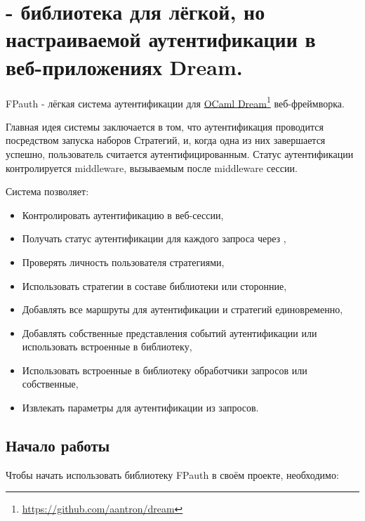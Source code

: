 \section{ - библиотека для лёгкой, но настраиваемой аутентификации в веб-приложениях Dream.\label{fpauth---библиотека-для-лёгкой,-но-в-то-же-время-настраиваемой-аутентификации-в-веб-приложениях-dream.}}\label{page-FPauth-leaf-page-index}%
FPauth - лёгкая система аутентификации для \href{https://github.com/aantron/dream}{OCaml Dream}\footnote{\url{https://github.com/aantron/dream}} веб-фреймворка.

Главная идея системы заключается в том, что аутентификация проводится посредством запуска наборов Стратегий, и, когда одна из них завершается успешно, пользователь считается аутентифицированным. Статус аутентификации контролируется middleware, вызываемым после middleware сессии.

Система позволяет:

\begin{itemize}\item{Контролировать аутентификацию в веб-сессии,}%
\item{Получать статус аутентификации для каждого запроса через ,}%
\item{Проверять личность пользователя стратегиями,}%
\item{Использовать стратегии в составе библиотеки или сторонние,}%
\item{Добавлять все маршруты для аутентификации и стратегий единовременно,}%
\item{Добавлять собственные представления событий аутентификации или использовать встроенные в библиотеку,}%
\item{Использовать встроенные в библиотеку обработчики запросов или собственные,}%
\item{Извлекать параметры для аутентификации из запросов.}\end{itemize}%
\subsection{Начало работы\label{Начало-работы}}%
Чтобы начать использовать библиотеку FPauth в своём проекте, необходимо:

